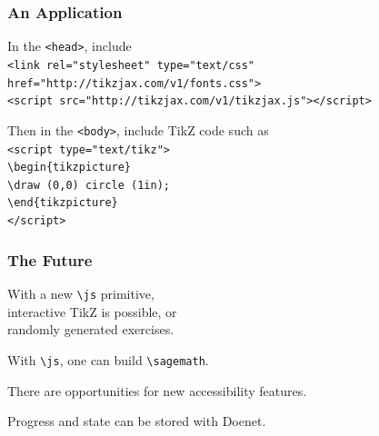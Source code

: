 \documentclass[aspectratio=169,14pt]{beamer}
\begin{document}
\begin{frame}
  \frametitle{An Application}

  In the \texttt{<head>}, include \\
  \quad\texttt{<link rel="stylesheet" type="text/css" } \\
  \quad\quad\texttt{href="http://tikzjax.com/v1/fonts.css">} \\
  \quad\texttt{<script src="http://tikzjax.com/v1/tikzjax.js"></script>}

  \vfill
  
Then in the \texttt{<body>}, include TikZ code such as \\
\quad\texttt{<script type="text/tikz">} \\
\quad\quad\texttt{\textbackslash begin\{tikzpicture\}} \\
\quad\quad\texttt{\textbackslash draw (0,0) circle (1in);} \\
\quad\quad\texttt{\textbackslash end\{tikzpicture\}} \\
\quad\texttt{</script>}
  
\end{frame}

\begin{frame}
  \frametitle{The Future}
  \Large

  With a new \texttt{\textbackslash js} primitive, \\
  \quad interactive TikZ is possible, or \\
  \quad randomly generated exercises.

  \vfill
  
  With \texttt{\textbackslash js}, one can build \texttt{\textbackslash sagemath}.

  \vfill

  There are opportunities for new accessibility features.
  
  \vfill

  Progress and state can be stored with Doenet.
  
\end{frame}
\end{document}
